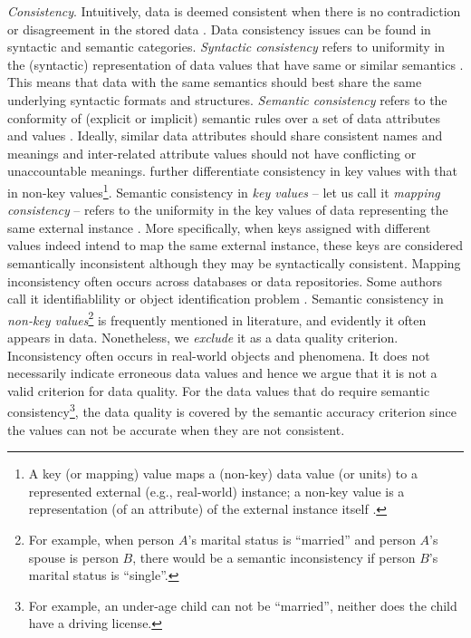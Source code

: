 \textit{Consistency}. 
Intuitively, data is deemed consistent when there is no contradiction or disagreement in the stored data \citep{Wang1996}. 
Data consistency issues can be found in syntactic and semantic categories. \textit{Syntactic consistency} refers to uniformity in the (syntactic) representation of data values that have same or similar semantics \citep{Pipino2002,Loshin2011}. This means that data with the same semantics should best share the same underlying syntactic formats and structures. 
\textit{Semantic consistency} refers to the %
conformity of (explicit or implicit) semantic rules over a set of data attributes and values \citep{Batini2009}. Ideally, similar data attributes should share consistent names and meanings \citep{Loshin2011} and inter-related attribute values should not have conflicting or unaccountable meanings. 
\citet{Price2005} further differentiate consistency in key values with that in non-key values\footnote{A key (or mapping) value maps a (non-key) data value (or units) to a represented external (e.g., real-world) instance; a non-key value is a representation (of an attribute) of the external instance itself \citep{Price2005}.}.
% 
Semantic consistency in \emph{key values} -- let us call it \textit{mapping consistency} -- refers to the uniformity in the key values of data representing the same external instance \parencite*{Price2005}. 
More specifically, when keys assigned with different values indeed intend to map the same external instance, these keys are considered semantically inconsistent although they may be syntactically consistent. 
Mapping inconsistency often occurs across databases or data repositories. Some authors call it identifiablility or object identification problem \citep[e.g.,][]{Batini2006,Loshin2011}.
% 
Semantic consistency in \emph{non-key values}\footnote{For example, when person $A$'s marital status is ``married'' and person $A$'s spouse is person $B$, there would be a semantic inconsistency if person $B$'s marital status is ``single''.} is frequently mentioned in literature, and evidently it often appears in data.   
Nonetheless, we \emph{exclude} it as a data quality criterion. %
Inconsistency often occurs in real-world objects and phenomena. It does not necessarily indicate erroneous data values and hence we argue that it is not a valid criterion for data quality. 
For the data values that do require semantic consistency\footnote{For example, an under-age child can not be ``married'', neither does the child have a driving license.}, the data quality is covered by the semantic accuracy criterion since the values can not be accurate when they are not consistent. 

